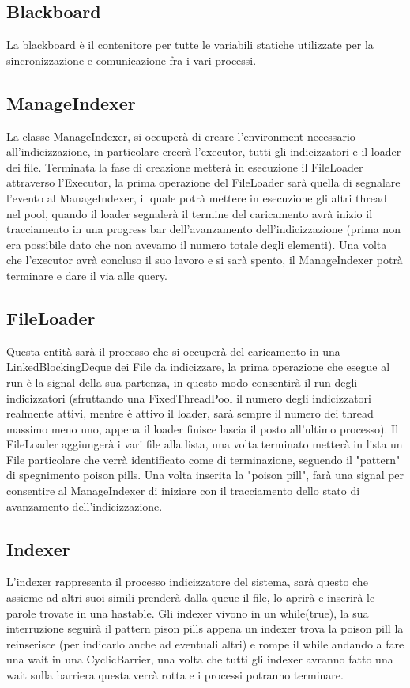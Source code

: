 \documentclass{article}
\begin{document}
\subsection{Blackboard}
La blackboard è il contenitore per tutte le variabili statiche utilizzate per la sincronizzazione e comunicazione fra i vari processi.
\subsection{ManageIndexer}
La classe ManageIndexer, si occuperà di creare l'environment necessario all'indicizzazione, in particolare creerà l'executor, tutti gli indicizzatori e il loader dei file. Terminata la fase di creazione metterà in esecuzione il FileLoader attraverso l'Executor, la prima operazione del FileLoader sarà quella di segnalare l'evento al ManageIndexer, il quale potrà mettere in esecuzione gli altri thread nel pool, quando il loader segnalerà il termine del caricamento avrà inizio il tracciamento in una progress bar dell'avanzamento dell'indicizzazione (prima non era possibile dato che non avevamo il numero totale degli elementi). Una volta che l'executor avrà concluso il suo lavoro e si sarà spento, il ManageIndexer potrà terminare e dare il via alle query.
\subsection{FileLoader}
Questa entità sarà il processo che si occuperà del caricamento in una LinkedBlockingDeque dei File da indicizzare, la prima operazione che esegue al run è la signal della sua partenza, in questo modo consentirà il run degli indicizzatori (sfruttando una FixedThreadPool il numero degli indicizzatori realmente attivi, mentre è attivo il loader, sarà sempre il numero dei thread massimo meno uno, appena il loader finisce lascia il posto all'ultimo processo). Il FileLoader aggiungerà i vari file alla lista, una volta terminato metterà in lista un File particolare che verrà identificato come di terminazione, seguendo il "pattern" di spegnimento poison pills. Una volta inserita la "poison pill", farà una signal per consentire al ManageIndexer di iniziare con il tracciamento dell\textsl{}o stato di avanzamento dell'indicizzazione.
\subsection{Indexer}
L'indexer rappresenta il processo indicizzatore del sistema, sarà questo che assieme ad altri suoi simili prenderà dalla queue il file, lo aprirà e inserirà le parole trovate in una hastable. Gli indexer vivono in un while(true), la sua interruzione seguirà il pattern pison pills appena un indexer trova la poison pill la reinserisce (per indicarlo anche ad eventuali altri) e rompe il while andando a fare una wait in una CyclicBarrier, una volta che tutti gli indexer avranno fatto una wait sulla barriera questa verrà rotta e i processi potranno terminare.
\end{document}
